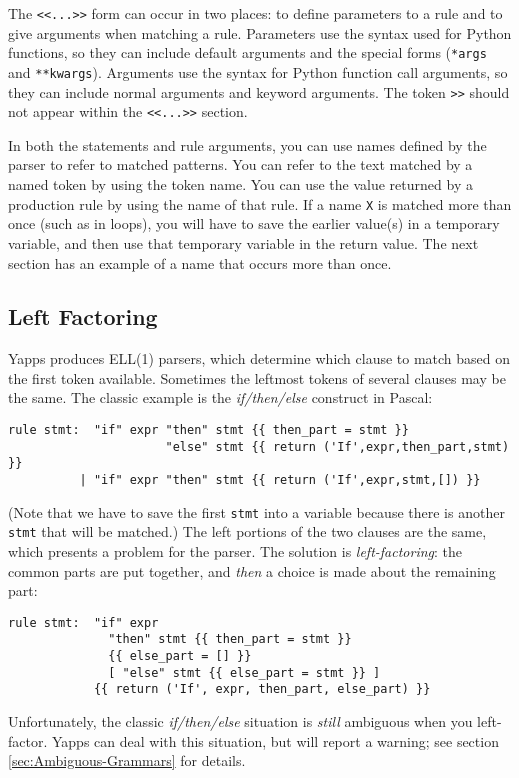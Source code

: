 \documentclass[10pt]{article}
\newcommand{\mysubsection}[1]{\subsection{#1}}
\begin{document}
The \verb|<<...>>| form can occur in two places: to define parameters
to a rule and to give arguments when matching a rule.  Parameters use
the syntax used for Python functions, so they can include default
arguments and the special forms (\verb|*args| and \verb|**kwargs|).
Arguments use the syntax for Python function call arguments, so they
can include normal arguments and keyword arguments.  The token
\verb|>>| should not appear within the \verb|<<...>>| section.

In both the statements and rule arguments, you can use names defined
by the parser to refer to matched patterns.  You can refer to the text
matched by a named token by using the token name.  You can use the
value returned by a production rule by using the name of that rule.
If a name \texttt{X} is matched more than once (such as in loops), you
will have to save the earlier value(s) in a temporary variable, and
then use that temporary variable in the return value.  The next
section has an example of a name that occurs more than once.

\mysubsection{Left Factoring}
\label{sec:Left-Factoring}

Yapps produces ELL(1) parsers, which determine which clause to match
based on the first token available.  Sometimes the leftmost tokens of
several clauses may be the same.  The classic example is the
\emph{if/then/else} construct in Pascal:

\begin{verbatim}
rule stmt:  "if" expr "then" stmt {{ then_part = stmt }} 
                      "else" stmt {{ return ('If',expr,then_part,stmt) }}
          | "if" expr "then" stmt {{ return ('If',expr,stmt,[]) }}
\end{verbatim}

(Note that we have to save the first \texttt{stmt} into a variable
because there is another \texttt{stmt} that will be matched.)  The
left portions of the two clauses are the same, which presents a
problem for the parser.  The solution is \emph{left-factoring}: the
common parts are put together, and \emph{then} a choice is made about
the remaining part:

\begin{verbatim}
rule stmt:  "if" expr 
              "then" stmt {{ then_part = stmt }}
              {{ else_part = [] }}
              [ "else" stmt {{ else_part = stmt }} ]
            {{ return ('If', expr, then_part, else_part) }}
\end{verbatim}

Unfortunately, the classic \emph{if/then/else} situation is
\emph{still} ambiguous when you left-factor.  Yapps can deal with this
situation, but will report a warning; see section
\ref{sec:Ambiguous-Grammars} for details.
\end{document}
